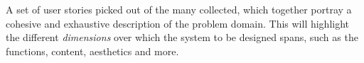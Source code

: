 \begin{definition} \label{def:scenario_corpus} 
  A set of user stories picked out of the many collected, which together portray a cohesive and exhaustive description of the problem domain. This will highlight the different \emph{dimensions} over which the system to be designed spans, such as the functions, content, aesthetics and more. \cite[p. 67-68]{benyon14}
\end{definition}
